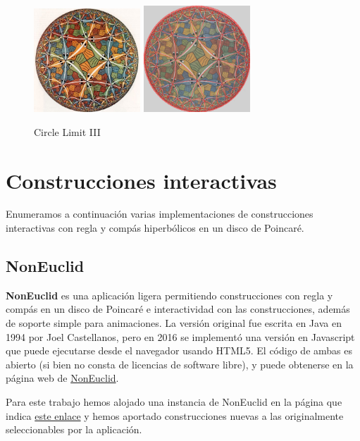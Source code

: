 \documentclass{article}
\theoremstyle{plain}
\theoremstyle{definition}
\theoremstyle{remark}
\begin{document}
\begin{figure}[ht!]
  \centering
  \includegraphics[width=40mm]{./limit3.jpg}
  \includegraphics[width=40mm]{./limit3overlay.png}
  \caption{Circle Limit III\label{limit3}}
\end{figure}



\section{Construcciones interactivas}
Enumeramos a continuación varias implementaciones de construcciones interactivas
con regla y compás hiperbólicos en un disco de Poincaré.

\subsection{NonEuclid}
\textbf{NonEuclid} es una aplicación ligera permitiendo construcciones
con regla y compás en un disco de Poincaré e interactividad con las
construcciones, además de soporte simple para animaciones. La versión
original fue escrita en Java en 1994 por Joel Castellanos, pero en
2016 se implementó una versión en Javascript que puede ejecutarse
desde el navegador usando HTML5. El código de ambas es abierto (si
bien no consta de licencias de software libre), y puede obtenerse en
la página web de
\href{https://www.cs.unm.edu/~joel/NonEuclid/NonEuclid.html}{NonEuclid}.

Para este trabajo hemos alojado una instancia de NonEuclid en la
página que indica \href{https://m42.github.io/hiperboloide/}{este
  enlace} y hemos aportado construcciones nuevas a las originalmente
seleccionables por la aplicación.
\end{document}

